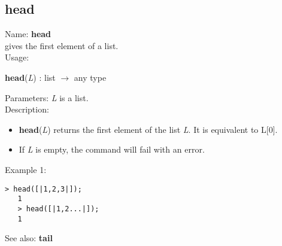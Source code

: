 \subsection{ head }
\noindent Name: \textbf{head}\\
gives the first element of a list.\\

\noindent Usage: 
\begin{center}
\textbf{head}(\emph{L}) : \textsf{list} $\rightarrow$ \textsf{any type}\\
\end{center}
Parameters: 
\emph{L} is a list.\\

\noindent Description: \begin{itemize}

\item \textbf{head}(\emph{L}) returns the first element of the list \emph{L}. It is equivalent
   to L[0].

\item If \emph{L} is empty, the command will fail with an error.
\end{itemize}
\noindent Example 1: 
\begin{center}\begin{minipage}{14.8cm}\begin{Verbatim}[frame=single]
   > head([|1,2,3|]);
   1
   > head([|1,2...|]);
   1
\end{Verbatim}
\end{minipage}\end{center}
See also: \textbf{tail}
